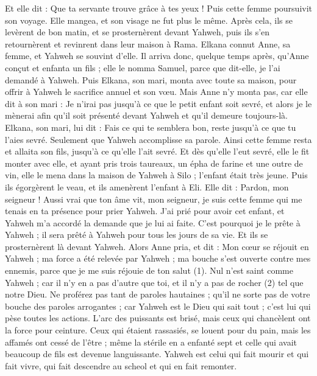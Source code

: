 \begin{multicols}{2}
Et elle dit : Que ta servante trouve grâce à tes yeux ! Puis cette femme poursuivit son voyage. Elle mangea, et son visage ne fut plus le même.
Après cela, ils se levèrent de bon matin, et se prosternèrent devant Yahweh, puis ils s'en retournèrent et revinrent dans leur maison à Rama. Elkana connut Anne, sa femme, et Yahweh se souvint d'elle.
Il arriva donc, quelque temps après, qu'Anne conçut et enfanta un fils ; elle le nomma Samuel, parce que dit-elle, je l'ai demandé à Yahweh.
Puis Elkana, son mari, monta avec toute sa maison, pour offrir à Yahweh le sacrifice annuel et son vœu.
Mais Anne n'y monta pas, car elle dit à son mari : Je n’irai pas jusqu'à ce que le petit enfant soit sevré, et alors je le mènerai afin qu'il soit présenté devant Yahweh et qu'il demeure toujours-là.
Elkana, son mari, lui dit : Fais ce qui te semblera bon, reste jusqu'à ce que tu l'aies sevré. Seulement que Yahweh accomplisse sa parole. Ainsi cette femme resta et allaita son fils, jusqu'à ce qu'elle l’ait sevré.
Et dès qu'elle l'eut sevré, elle le fit monter avec elle, et ayant pris trois taureaux, un épha de farine et une outre de vin, elle le mena dans la maison de Yahweh à Silo ; l'enfant était très jeune.
Puis ils égorgèrent le veau, et ils amenèrent l'enfant à Eli.
Elle dit : Pardon, mon seigneur ! Aussi vrai que ton âme vit, mon seigneur, je suis cette femme qui me tenais en ta présence pour prier Yahweh.
J'ai prié pour avoir cet enfant, et Yahweh m’a accordé la demande que je lui ai faite.
C'est pourquoi je le prête à Yahweh ; il sera prêté à Yahweh pour tous les jours de sa vie. Et ils se prosternèrent là devant Yahweh.
\VerseOne{}Alors Anne pria, et dit : Mon cœur se réjouit en Yahweh ; ma force a été relevée par Yahweh ; ma bouche s'est ouverte contre mes ennemis, parce que je me suis réjouie de ton salut (1).
Nul n’est saint comme Yahweh ; car il n'y en a pas d'autre que toi, et il n'y a pas de rocher (2) tel que notre Dieu.
Ne proférez pas tant de paroles hautaines ; qu'il ne sorte pas de votre bouche des paroles arrogantes ; car Yahweh est le Dieu qui sait tout ; c'est lui qui pèse toutes les actions.
L'arc des puissants est brisé, mais ceux qui chancèlent ont la force pour ceinture.
Ceux qui étaient rassasiés, se louent pour du pain, mais les affamés ont cessé de l'être ; même la stérile en a enfanté sept et celle qui avait beaucoup de fils est devenue languissante.
Yahweh est celui qui fait mourir et qui fait vivre, qui fait descendre au scheol et qui en fait remonter.

\end{multicols}
